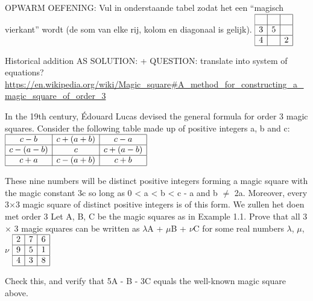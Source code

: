 \documentclass{ximera}
\begin{document}
\author{Alexander Holvoet}







OPWARM OEFENING:
Vul in onderstaande tabel zodat het een ``magisch vierkant'' wordt (de som van elke rij, kolom en diagonaal is gelijk).
\(
\begin{array}{|c|c|c|}
\hline
 &  &  \\
\hline
3 & 5 &  \\
\hline
4 &  & 2 \\
\hline
\end{array}
\)

Historical addition AS SOLUTION: + QUESTION: translate into system of equations?
\url{https://en.wikipedia.org/wiki/Magic_square#A_method_for_constructing_a_magic_square_of_order_3}

In the 19th century, Édouard Lucas devised the general formula for order 3 magic squares. Consider the following table made up of positive integers a, b and c:
\(
\begin{array}{|c|c|c|}
\hline
c - b & c + (a + b) & c - a \\
\hline
c - (a - b) & c & c + (a - b) \\
\hline
c + a & c - (a + b) & c + b \\
\hline
\end{array}
\)

These nine numbers will be distinct positive integers forming a magic square with the magic constant 3c so long as 0 < a < b < c - a and b $\neq$ 2a. Moreover, every 3$\times$3 magic square of distinct positive integers is of this form. 
We zullen het doen met order 3
Let A, B, C be the magic squares as in Example 1.1. Prove that all 3 $\times$ 3
magic squares can be written as $\lambda$A + $\mu$B + $\nu$C for some real numbers $\lambda$, $\mu$, $\nu$
\(
\begin{array}{|c|c|c|}
\hline
2 & 7 & 6 \\
\hline
9 & 5 & 1 \\
\hline
4 & 3 & 8 \\
\hline
\end{array}
\)

Check this, and verify that 5A - B - 3C equals the well-known magic square above.
\end{document}
